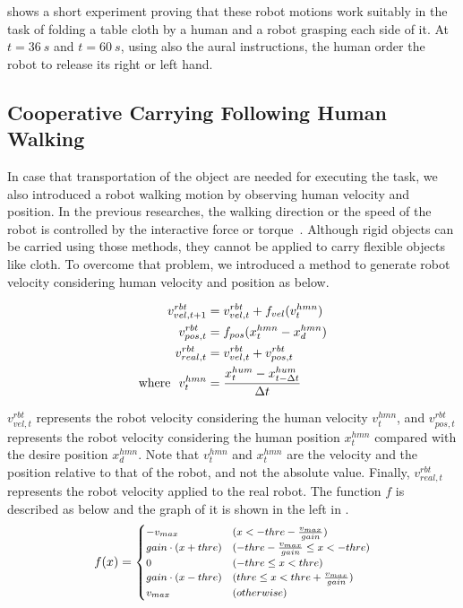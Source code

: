  shows a short experiment proving that these robot motions work suitably in the task of folding a table cloth by a human and a robot grasping each side of it. At \(t=\SI{36}{s}\) and \(t=\SI{60}{s}\), using also the aural instructions, the human order the robot to release its right or left hand.\par

\subsection{Cooperative Carrying Following Human Walking}
\label{subsec:walk}
In case that transportation of the object are needed for executing the task, we also introduced a robot walking motion by observing human velocity and position. In the previous researches, the walking direction or the speed of the robot is controlled by the interactive force or torque~\cite{aist_cooperative_carrying}\cite{carry_table}. Although rigid objects can be carried using those methods, they cannot be applied to carry flexible objects like cloth. To overcome that problem, we introduced a method to generate robot velocity considering human velocity and position as below.

\begin{align}
v^{rbt}_{vel, t+1} &= v^{rbt}_{vel, t} + f_{vel}(v^{hmn}_t) \label{equation:v_vel}\\
v^{rbt}_{pos, t} &= f_{pos}(x^{hmn}_t-x^{hmn}_{d}) \label{equation:v_pos}\\
v^{rbt}_{real, t} &= v^{rbt}_{vel,t} + v^{rbt}_{pos,t} \label{equation:v_real}\\
{\rm where} \ \ v^{hmn}_{t} &= \frac{x^{hum}_{t} - x^{hum}_{t-\Delta t}}{\Delta t} \nonumber
\end{align}

\(v^{rbt}_{vel, t}\) represents the robot velocity considering the human velocity \(v^{hmn}_{t}\), and \(v^{rbt}_{pos, t}\) represents the robot velocity considering the human position \(x^{hmn}_{t}\) compared with the desire position \(x^{hmn}_{d}\). Note that \(v^{hmn}_{t}\) and \(x^{hmn}_{t}\) are the velocity and the position relative to that of the robot, and not the absolute value. Finally, \(v^{rbt}_{real, t}\) represents the robot velocity applied to the real robot. The function \(f\) is described as below and the graph of it is shown in the left in .
\begin{equation}
  \begin{footnotesize}
  f(x) =
  \begin{cases}
    -v_{max} & (x < -thre - \frac{v_{max}}{gain}) \\
    gain\cdot(x+thre) & (-thre - \frac{v_{max}}{gain} \le x < -thre) \\
    0 & (-thre \le x < thre) \\
    gain\cdot(x-thre) & (thre \le x < thre + \frac{v_{max}}{gain}) \\
    v_{max} & (otherwise) \\
  \end{cases}
  \end{footnotesize}
\end{equation}

